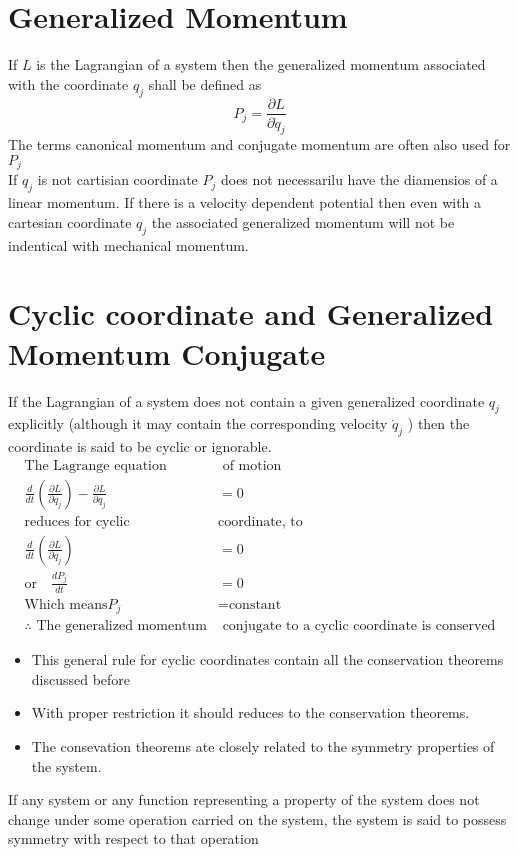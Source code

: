 \section{Generalized Momentum}
If $L$ is the Lagrangian of a system then the generalized momentum associated with the coordinate $q_j$ shall be defined as
$$P_j=\frac{\partial L}{\partial \dot{q}_j}$$
The terms canonical momentum and conjugate momentum are often also used for $P_j$\\
If $q_j$ is not cartisian coordinate $P_j$ does not necessarilu have the diamensios of a linear momentum. If there is a velocity dependent potential then even with a cartesian coordinate $q_j$ the associated generalized momentum will not be indentical with mechanical momentum.
\section{Cyclic coordinate and Generalized Momentum Conjugate }
If the Lagrangian of a system does not contain a given generalized coordinate $q_j$ explicitly (although it may contain the corresponding velocity $\dot{q}_j$ ) then the coordinate is said to be cyclic or ignorable.
\begin{align*}
\text{The Lagrange equation}&\text{ of motion}\\
\frac{d}{dt}\left( \frac{\partial L}{\partial \dot{q}_j}\right)-\frac{\partial L}{\partial q_j} &=0\\
\text{reduces for cyclic }&\text{coordinate, to}\\
\frac{d}{dt}\left(\frac{\partial L}{\partial \dot{q}_j} \right) &=0\\
\text{or}\quad
\frac{dP_j}{dt}&=0\\
\text{Which means}
P_j&=\text{constant}\\
\therefore \text{ The generalized momentum}&\text{ conjugate to a cyclic coordinate is conserved}
\end{align*}
\begin{itemize}
	\item This general rule for cyclic coordinates contain all the conservation theorems discussed before 
	\item With proper restriction it should reduces to the conservation theorems. 
	\item The consevation theorems ate closely related to the symmetry properties of the system.
\end{itemize}
\begin{note}
	If any system or any function representing a property of the system does not change under some operation carried on the system, the system is said to possess symmetry with respect to that operation 
\end{note}
